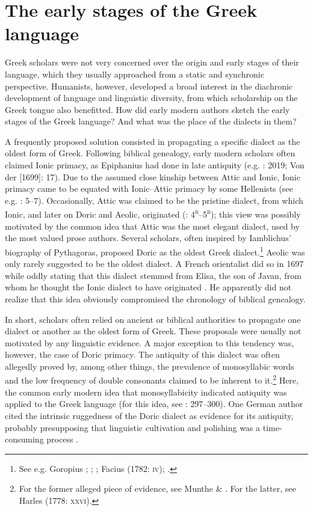 \section{The early stages of the Greek language}

Greek scholars were not very concerned over the origin and early stages of their language, which they usually approached from a static and synchronic perspective. Humanists, however, developed a broad interest in the diachronic development of language and linguistic diversity, from which scholarship on the Greek tongue also benefitted. How did early modern authors sketch the early stages of the Greek language? And what was the place of the dialects in them?

A frequently proposed solution consisted in propagating a specific dialect as the oldest form of Greek. Following biblical genealogy, early modern scholars often claimed Ionic primacy, as Epiphanius had done in late antiquity (e.g. \citealt{Alsted1630}: 2019; Von der \citealt{Hardt1705} [1699]: 17). Due to the assumed close kinship between Attic and Ionic, Ionic primacy came to be equated with Ionic–Attic primacy by some Hellenists (see e.g. \citealt{Schmidt1604}: 5–7). Occasionally, Attic was claimed to be the pristine dialect, from which Ionic, and later on Doric and Aeolic, originated (\citealt{Baile1588}: 4\textsc{\textsuperscript{r}}–5\textsc{\textsuperscript{r}}); this view was possibly motivated by the common idea that Attic was the most elegant dialect, used by the most valued prose authors. Several scholars, often inspired by Iamblichus’ biography of Pythagoras, proposed Doric as the oldest Greek dialect.\footnote{See e.g. Goropius \citet[860]{Becanus1569}; \citet[29]{Burton1657}; \citet[118]{Mazzocchi1754}; Facius (1782: \textsc{iv}); \citet[21]{Gedike1782}.} Aeolic was only rarely suggested to be the oldest dialect. A French orientalist did so in 1697 while oddly stating that this dialect stemmed from Elisa, the son of Javan, from whom he thought the Ionic dialect to have originated \citep[110]{Thomassin1697}. He apparently did not realize that this idea obviously compromised the chronology of biblical genealogy.

In short, scholars often relied on ancient or biblical authorities to propagate one dialect or another as the oldest form of Greek. These proposals were usually not motivated by any linguistic evidence. A major exception to this tendency was, however, the case of Doric primacy. The antiquity of this dialect was often allegedly proved by, among other things, the prevalence of monosyllabic words and the low frequency of double consonants claimed to be inherent to it.\footnote{For the former alleged piece of evidence, see Munthe \& \citet[17]{Heiberg1748}. For the latter, see Harles (1778: \textsc{xxvi).}} Here, the common early modern idea that monosyllabicity indicated antiquity was applied to the Greek language (for this idea, see \citealt{Jansen1995}: 297–300). One German author cited the intrinsic ruggedness of the Doric dialect as evidence for its antiquity, probably presupposing that linguistic cultivation and polishing was a time-consuming process \citep[21]{Gedike1782}.

